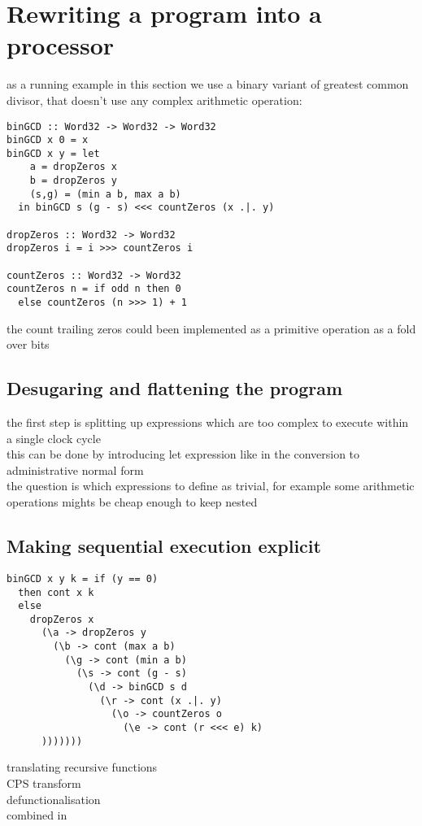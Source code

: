 \documentclass[preprint]{sigplanconf}
\begin{document}
\section{Rewriting a program into a processor}
as a running example in this section we use a binary variant of greatest common divisor, that doesn't use any complex arithmetic operation:
\begin{lstlisting}
binGCD :: Word32 -> Word32 -> Word32       
binGCD x 0 = x
binGCD x y = let
    a = dropZeros x
    b = dropZeros y
    (s,g) = (min a b, max a b)
  in binGCD s (g - s) <<< countZeros (x .|. y)

dropZeros :: Word32 -> Word32
dropZeros i = i >>> countZeros i

countZeros :: Word32 -> Word32
countZeros n = if odd n then 0 
  else countZeros (n >>> 1) + 1
\end{lstlisting}
the count trailing zeros could been implemented as a primitive operation as a fold over bits

\subsection{Desugaring and flattening the program}
the first step is splitting up expressions which are too complex to execute within a single clock cycle \\
this can be done by introducing let expression like in the conversion to administrative normal form \cite{ANF} \\
the question is which expressions to define as trivial, for example some arithmetic operations mights be cheap enough to keep nested \\


\subsection{Making sequential execution explicit}
\begin{lstlisting}
binGCD x y k = if (y == 0)
  then cont x k
  else
    dropZeros x
      (\a -> dropZeros y
        (\b -> cont (max a b)
          (\g -> cont (min a b)
            (\s -> cont (g - s)
              (\d -> binGCD s d
                (\r -> cont (x .|. y)
                  (\o -> countZeros o
                    (\e -> cont (r <<< e) k)
      )))))))
\end{lstlisting}

translating recursive functions \cite{Ingmar} \cite{Zhai} \\
CPS transform \cite{AppelCwC} \\
defunctionalisation \cite{Reynolds} \\
combined in \cite{CCC}
\end{document}
